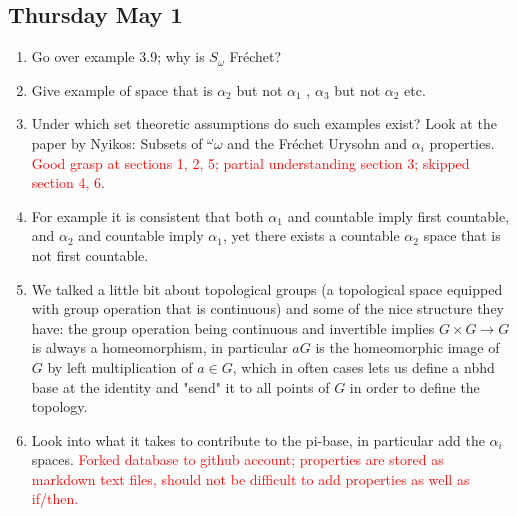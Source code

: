 \documentclass{article}
\begin{document}
\subsection*{Thursday May 1}
\begin{enumerate}
    \item Go over example 3.9; why is \(S_{\omega}\) Fréchet? \checkmark
    \item Give example of space that is \(\alpha_2\) but not \(\alpha_1\) \checkmark, \(\alpha_3\) but not \(\alpha_2\) etc. 
    \item Under which set theoretic assumptions do such examples exist? Look at the paper by Nyikos: Subsets of \(^\omega \omega\) and the Fréchet Urysohn and \(\alpha_i\) properties. \textcolor{red}{Good grasp at sections 1, 2, 5; partial understanding section 3; skipped section 4, 6}.
    
    \item For example it is consistent that both \(\alpha_1\) and countable imply first countable, and \(\alpha_2\) and countable imply  \(\alpha_1\), yet there exists a countable \(\alpha_2\) space that is not first countable.

    \item We talked a little bit about topological groups (a topological space equipped with group operation that is continuous) and some of the nice structure they have: the group operation being continuous and invertible implies \(G\times G \to G\) is always a homeomorphism, in particular \(aG\) is the homeomorphic image of \(G\) by left multiplication of \(a \in G\), which in often cases lets us define a nbhd base at the identity and "send" it to all points of \(G\) in order to define the topology.
    \item Look into what it takes to contribute to the pi-base, in particular add the \(\alpha_i\) spaces.
    \textcolor{red}{Forked database to github account; properties are stored as markdown text files, should not be difficult to add properties as well as if/then.}


\end{enumerate}
\end{document}
